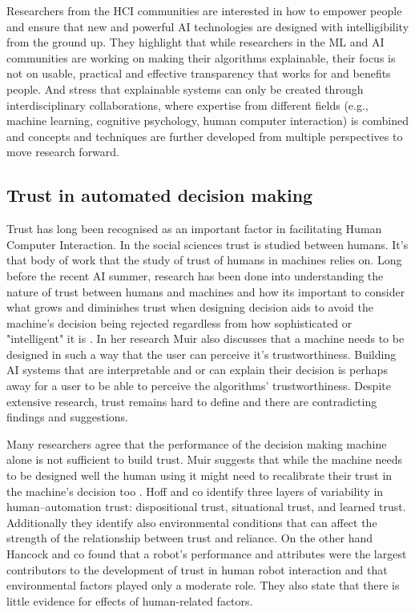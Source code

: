 \documentclass[manuscript,screen,review]{acmart}
\begin{document}
Researchers from the HCI communities are interested in how to empower people and ensure that new and powerful AI technologies are designed with intelligibility from the ground up.
They highlight that while researchers in the ML and AI communities are working on making their algorithms explainable, their focus is not on usable, practical and effective transparency that works for and benefits people.
And stress that explainable systems can only be created through interdisciplinary collaborations, where expertise from different fields (e.g., machine learning, cognitive psychology, human computer interaction) is combined and concepts and techniques are further developed from multiple perspectives to move research forward.\cite{Abdul2018}

\subsection{Trust in automated decision making}\label{subsec:trust}

Trust has long been recognised as an important factor in facilitating Human Computer Interaction\cite{Lee2008}.
In the social sciences trust is studied between humans.
It's that body of work that the study of trust of humans in machines relies on.
Long before the recent AI summer, research has been done into understanding the nature of trust between humans and machines and how its important to consider what grows and diminishes trust when designing decision aids to avoid the machine's decision being rejected regardless from how sophisticated or "intelligent" it is \cite{Muir1987}.
In her research Muir also discusses that a machine needs to be designed in such a way that the user can perceive it's trustworthiness\cite{Muir1987}.
Building AI systems that are interpretable and or can explain their decision is perhaps away for a user to be able to perceive the algorithms' trustworthiness.
Despite extensive research, trust remains hard to define and there are contradicting findings and suggestions.

Many researchers agree that the performance of the decision making machine alone is not sufficient to build trust.
Muir suggests that while the machine needs to be designed well the human using it might need to recalibrate their trust in the machine's decision too \cite{Muir1987}.
Hoff and co identify three layers of variability in human–automation trust: dispositional trust, situational trust, and learned trust.
Additionally they identify also environmental conditions that can affect the strength of the relationship between trust and reliance\cite{Hoff2015}.
On the other hand Hancock and co found that a robot's performance and attributes were the largest contributors to the development of trust in human robot interaction and that environmental factors played only a moderate role.
They also state that there is little evidence for effects of human-related factors\cite{Hancock2011}.
\end{document}
